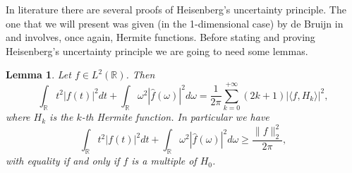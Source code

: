 \documentclass[corpo=11pt, stile=classica, tipotesi=custom,
greek, evenboxes, english]{toptesi}
\numberwithin{equation}{chapter}
\newtheorem{lem}[teo]{Lemma}
\theoremstyle{definition}
\theoremstyle{remark}
\newcommand{\R}{\mathbb{R}} %
\begin{document}
In literature there are several proofs of Heisenberg's uncertainty principle. The one that we will present was given (in the 1-dimensional case) by de Bruijn in \cite{de_bruijn} and involves, once again, Hermite functions. Before stating and proving Heisenberg's uncertainty principle we are going to need some lemmas.
\begin{lem}\label{Heisenberg's uncertainty principle lemma}
	Let $f \in L^2(\R)$. Then
	\begin{equation}\label{Heisenberg's uncertainty principle lemma formula}
		\int_{\R} t^2 |f(t)|^2dt + \int_{\R} \omega^2 |\hat{f}(\omega)|^2d\omega = \dfrac{1}{2\pi} \sum_{k=0}^{+\infty} (2k+1)|\langle f,H_k \rangle|^2,
	\end{equation}
	where $H_k$ is the $k$-th Hermite function. In particular we have
	\begin{equation}\label{Heisenberg's uncertainty principle lemma inequality}
		\int_{\R} t^2 |f(t)|^2dt + \int_{\R} \omega^2 |\hat{f}(\omega)|^2d\omega \geq \dfrac{\|f\|_2^2}{2\pi},
	\end{equation}
	with equality if and only if $f$ is a multiple of $H_0$.
\end{lem}
\end{document}
